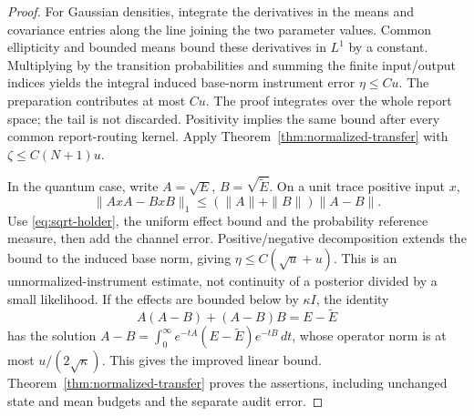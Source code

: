 \begin{proof}
For Gaussian densities, integrate the derivatives in the means and covariance entries along the line joining the two parameter values. Common ellipticity and bounded means bound these derivatives in $L^1$ by a constant. Multiplying by the transition probabilities and summing the finite input/output indices yields the integral induced base-norm instrument error $\eta\le Cu$. The preparation contributes at most $Cu$. The proof integrates over the whole report space; the tail is not discarded. Positivity implies the same bound after every common report-routing kernel. Apply Theorem~\ref{thm:normalized-transfer} with $\zeta\le C(N+1)u$.

In the quantum case, write $A=\sqrt E$, $B=\sqrt{\widetilde E}$. On a unit trace positive input $x$,
\[
 \|AxA-BxB\|_1\le(\|A\|+\|B\|)\|A-B\|.
\]
Use \eqref{eq:sqrt-holder}, the uniform effect bound and the probability reference measure, then add the channel error. Positive/negative decomposition extends the bound to the induced base norm, giving $\eta\le C(\sqrt u+u)$. This is an unnormalized-instrument estimate, not continuity of a posterior divided by a small likelihood. If the effects are bounded below by $\kappa I$, the identity
\[
 A(A-B)+(A-B)B=E-\widetilde E
\]
has the solution $A-B=\int_0^\infty e^{-tA}(E-\widetilde E)e^{-tB}\,dt$, whose operator norm is at most $u/(2\sqrt\kappa)$. This gives the improved linear bound. Theorem~\ref{thm:normalized-transfer} proves the assertions, including unchanged state and mean budgets and the separate audit error.
\end{proof}
